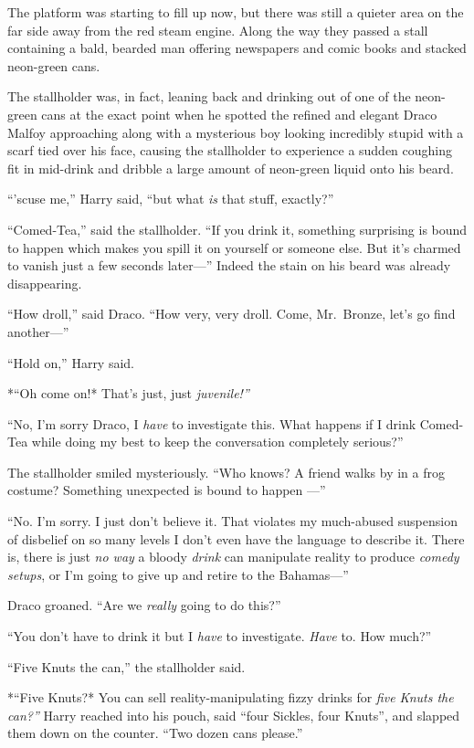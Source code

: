 The platform was starting to fill up now, but there was still a quieter
area on the far side away from the red steam engine. Along the way they
passed a stall containing a bald, bearded man offering newspapers and
comic books and stacked neon-green cans.

The stallholder was, in fact, leaning back and drinking out of one of
the neon-green cans at the exact point when he spotted the refined and
elegant Draco Malfoy approaching along with a mysterious boy looking
incredibly stupid with a scarf tied over his face, causing the
stallholder to experience a sudden coughing fit in mid-drink and dribble
a large amount of neon-green liquid onto his beard.

``'scuse me,'' Harry said, ``but what \emph{is} that stuff, exactly?''

``Comed-Tea,'' said the stallholder. ``If you drink it, something
surprising is bound to happen which makes you spill it on yourself or
someone else. But it's charmed to vanish just a few seconds later---''
Indeed the stain on his beard was already disappearing.

``How droll,'' said Draco. ``How very, very droll. Come, Mr.~Bronze,
let's go find another---''

``Hold on,'' Harry said.

*``Oh come on!* That's just, just \emph{juvenile!''}

``No, I'm sorry Draco, I \emph{have} to investigate this. What happens
if I drink Comed-Tea while doing my best to keep the conversation
completely serious?''

The stallholder smiled mysteriously. ``Who knows? A friend walks by in a
frog costume? Something unexpected is bound to happen ---''

``No. I'm sorry. I just don't believe it. That violates my much-abused
suspension of disbelief on so many levels I don't even have the language
to describe it. There is, there is just \emph{no way} a bloody
\emph{drink} can manipulate reality to produce \emph{comedy setups}, or
I'm going to give up and retire to the Bahamas---''

Draco groaned. ``Are we \emph{really} going to do this?''

``You don't have to drink it but I \emph{have} to investigate.
\emph{Have} to. How much?''

``Five Knuts the can,'' the stallholder said.

*``Five Knuts?* You can sell reality-manipulating fizzy drinks for
\emph{five Knuts the can?''} Harry reached into his pouch, said ``four
Sickles, four Knuts'', and slapped them down on the counter. ``Two dozen
cans please.''

